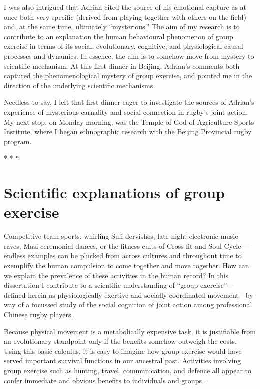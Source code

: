 \begin{CJK}{UTF8}{gbsn}
I was also intrigued that Adrian cited the source of his emotional capture as at once both very specific (derived from playing together with others on the field) and, at the same time, ultimately ``mysterious.''  The aim of my research is to contribute to an explanation the human behavioural phenomenon of group exercise in terms of its social, evolutionary, cognitive, and physiological causal processes and dynamics.  In essence, the aim is to somehow move from mystery to scientific mechanism.  At this first dinner in Beijing, Adrian's comments both captured the phenomenological mystery of group exercise, and pointed me in the direction of the underlying scientific mechanisms.

Needless to say, I left that first dinner eager to investigate the sources of Adrian's experience of mysterious carnality and social connection in rugby's joint action.  My next stop, on Monday morning, was the Temple of God of Agriculture Sports Institute, where I began ethnographic research with the Beijing Provincial rugby program.


                            \begin{center}
                              * * *
                            \end{center}





\section{Scientific explanations of group exercise}
Competitive team sports, whirling Sufi dervishes, late-night electronic music raves, Masi ceremonial dances, or the fitness cults of Cross-fit and Soul Cycle---endless examples can be plucked from across cultures and throughout time to exemplify the human compulsion to come together and move together.  How can we explain the prevalence of these activities in the human record?  In this dissertation I contribute to a scientific understanding of ``group exercise''---defined herein as physiologically exertive and socially coordinated movement---by way of a focussed study of the social cognition of joint action among professional Chinese rugby players.

Because physical movement is a metabolically expensive task, it is justifiable from an evolutionary standpoint only if the benefits somehow outweigh the costs.  Using this basic calculus, it is easy to imagine how group exercise would have served important survival functions in our ancestral past.  Activities involving group exercise such as hunting, travel, communication, and defence all appear to confer immediate and obvious benefits to individuals and groups \citep{Sands2010}.


\end{CJK}
